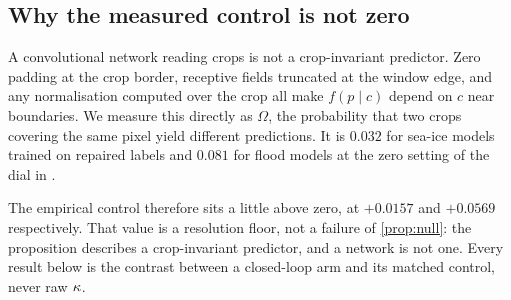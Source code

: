 \subsection{Why the measured control is not zero}
\label{sec:floor}

A convolutional network reading crops is not a crop-invariant predictor. Zero
padding at the crop border, receptive fields truncated at the window edge, and any
normalisation computed over the crop all make $f(p \mid c)$ depend on $c$ near
boundaries. We measure this directly as $\Omega$, the probability that two crops
covering the same pixel yield different predictions. It is $0.032$ for sea-ice
models trained on repaired labels and $0.081$ for flood models at the zero setting
of the dial in .

The empirical control therefore sits a little above zero, at $+0.0157$ and
$+0.0569$ respectively. That value is a resolution floor, not a failure of
\cref{prop:null}: the proposition describes a crop-invariant predictor, and a
network is not one. Every result below is the contrast between a closed-loop arm and
its matched control, never raw $\kappa$.
